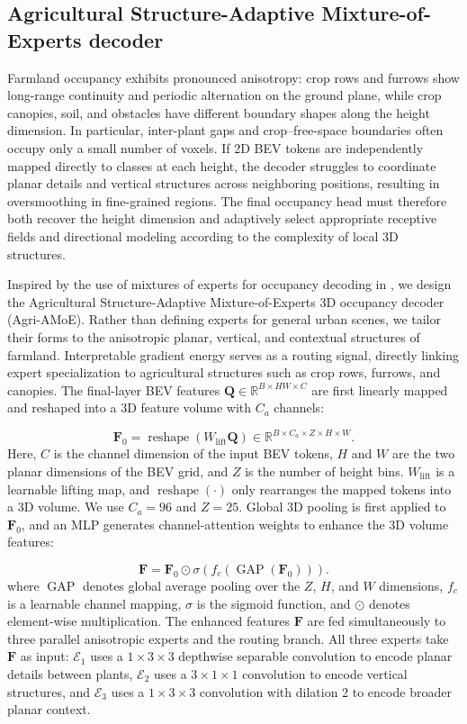 \documentclass[a4paper,fleqn]{cas-sc}
\newcommand{\R}{\mathbb{R}}
\begin{document}
\subsection{Agricultural Structure-Adaptive Mixture-of-Experts decoder}\label{sec:amoe}
Farmland occupancy exhibits pronounced anisotropy: crop rows and furrows show long-range continuity and periodic alternation on the ground plane, while crop canopies, soil, and obstacles have different boundary shapes along the height dimension.
In particular, inter-plant gaps and crop--free-space boundaries often occupy only a small number of voxels. If 2D BEV tokens are independently mapped directly to classes at each height, the decoder struggles to coordinate planar details and vertical structures across neighboring positions, resulting in oversmoothing in fine-grained regions.
The final occupancy head must therefore both recover the height dimension and adaptively select appropriate receptive fields and directional modeling according to the complexity of local 3D structures.

Inspired by the use of mixtures of experts for occupancy decoding in \citet{shi2026oneocc}, we design the Agricultural Structure-Adaptive Mixture-of-Experts 3D occupancy decoder (Agri-AMoE).
Rather than defining experts for general urban scenes, we tailor their forms to the anisotropic planar, vertical, and contextual structures of farmland. Interpretable gradient energy serves as a routing signal, directly linking expert specialization to agricultural structures such as crop rows, furrows, and canopies.
The final-layer BEV features $\bm{Q}\in\R^{B\times HW\times C}$ are first linearly mapped and reshaped into a 3D feature volume with $C_a$ channels:

\begin{equation}
\bm{F}_0=\operatorname{reshape}(W_{\mathrm{lift}}\bm{Q})\in\R^{B\times C_a\times Z\times H\times W}.
\end{equation}
Here, $C$ is the channel dimension of the input BEV tokens, $H$ and $W$ are the two planar dimensions of the BEV grid, and $Z$ is the number of height bins. $W_{\mathrm{lift}}$ is a learnable lifting map, and $\operatorname{reshape}(\cdot)$ only rearranges the mapped tokens into a 3D volume.
We use $C_a=96$ and $Z=25$. Global 3D pooling is first applied to $\bm{F}_0$, and an MLP generates channel-attention weights to enhance the 3D volume features:

\begin{equation}
\bm{F}=\bm{F}_0\odot\sigma\!\left(f_c(\operatorname{GAP}(\bm{F}_0))\right).
\end{equation}
where $\operatorname{GAP}$ denotes global average pooling over the $Z$, $H$, and $W$ dimensions, $f_c$ is a learnable channel mapping, $\sigma$ is the sigmoid function, and $\odot$ denotes element-wise multiplication.
The enhanced features $\bm{F}$ are fed simultaneously to three parallel anisotropic experts and the routing branch.
All three experts take $\bm{F}$ as input: $\mathcal{E}_1$ uses a $1\times3\times3$ depthwise separable convolution to encode planar details between plants, $\mathcal{E}_2$ uses a $3\times1\times1$ convolution to encode vertical structures, and $\mathcal{E}_3$ uses a $1\times3\times3$ convolution with dilation 2 to encode broader planar context.
\end{document}
